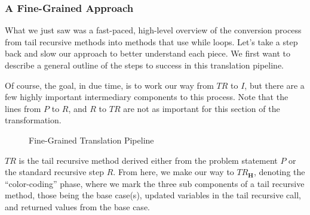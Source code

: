 \subsubsection*{A Fine-Grained Approach}
What we just saw was a fast-paced, high-level overview of the conversion process from tail recursive methods into methods that use while loops. Let’s take a step back and slow our approach to better understand each piece. We first want to describe a general outline of the steps to success in this translation pipeline. 

Of course, the goal, in due time, is to work our way from $TR$ to $I$, but there are a few highly important intermediary components to this process. Note that the lines from $P$ to $R$, and $R$ to $TR$ are not as important for this section of the transformation.

\begin{figure}[h!]
\centering
{}
\caption{Fine-Grained Translation Pipeline}
\end{figure}

$TR$ is the tail recursive method derived either from the problem statement $P$ or the standard recursive step $R$. From here, we make our way to \textit{$TR_\mathbf{H}$}, denoting the ``color-coding'' phase, where we mark the three sub components of a tail recursive method, those being the base case(s), updated variables in the tail recursive call, and returned values from the base case. 

